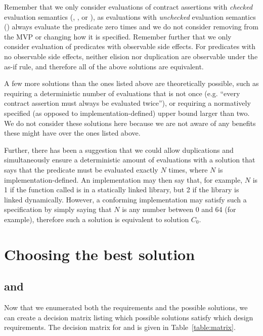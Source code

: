  Remember that we only consider evaluations of contract assertions with \emph{checked} evaluation semantics (, , or ), as evaluations with \emph{unchecked} evaluation semantics () always evaluate the predicate zero times and we do not consider removing  from the MVP or changing how it is specified. Remember further that we only consider evaluation of predicates with observable side effects. For predicates with no observable side effects, neither elision nor duplication are observable under the as-if rule, and therefore all of the above solutions are equivalent. 

A few more solutions than the ones listed above are theoretically possible, such as requiring a deterministic number of evaluations that is not once (e.g. ``every contract assertion must always be evaluated twice''), or requiring a normatively specified (as opposed to implementation-defined) upper bound larger than two. We do not consider these solutions here because we are not aware of any benefits these might have over the ones listed above. 

Further, there has been a suggestion that we could allow duplications and simultaneously ensure a deterministic amount of evaluations with a solution that says that the predicate must be evaluated exactly $N$ times, where $N$ is implementation-defined. An implementation may then say that, for example, $N$ is 1 if the function called is in a statically linked library, but 2 if the library is linked dynamically. However, a conforming implementation may satisfy such a specification by simply saying that $N$ is any number between 0 and 64 (for example), therefore such a solution is equivalent to solution $C_0$.


\section{Choosing the best solution}
\subsection{ and }
Now that we enumerated both the requirements and the possible solutions, we can create a decision matrix listing which possible solutions satisfy which design requirements. The decision matrix for  and  is given in Table~\ref{table:matrix}.


